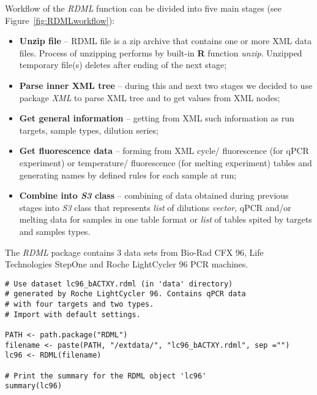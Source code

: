 \documentclass{bioinfo}
\begin{document}
Workflow of the \textit{RDML} function can be divided into five main stages (see Figure~\ref{fig:RDMLworkflow}):
\begin{itemize}
	\item \textbf{Unzip file} -- RDML file is a zip archive that contains one or more XML data files. Process of unzipping performs by built-in \textbf{R} function \textit{unzip}. Unzipped temporary file(s) deletes after ending of the next stage;
	\item \textbf{Parse inner XML tree} -- during this and next two stages we decided to use package \textit{XML} to parse XML tree and to get values from XML nodes;
	\item \textbf{Get general information} -- getting from XML such information as run targets, sample types, dilution series;
	\item \textbf{Get fluorescence data} -- forming from XML cycle/ fluorescence (for qPCR experiment) or temperature/ fluorescence (for melting experiment) tables and generating names by defined rules for each sample at run;
	\item \textbf{Combine into \textit{S3} class} -- combining of data obtained during previous stages into \textit{S3} class that represents \textit{list} of dilutions \textit{vector}, qPCR and/or melting data for samples in one table format or \textit{list} of tables spited by targets and samples types.
\end{itemize}

The \textit{RDML} package contains 3 data sets from Bio-Rad CFX 96, Life Technologies StepOne and Roche LightCycler 96 PCR machines.
\begin{figure*}
	\caption[]{\textit{RDML} workflow representation.}
	\label{fig:RDMLworkflow}
\end{figure*}

\begin{figure*}
\begin{verbatim}
# Use dataset lc96_bACTXY.rdml (in 'data' directory)
# generated by Roche LightCycler 96. Contains qPCR data
# with four targets and two types.
# Import with default settings.

PATH <- path.package("RDML")
filename <- paste(PATH, "/extdata/", "lc96_bACTXY.rdml", sep ="")
lc96 <- RDML(filename)

# Print the summary for the RDML object 'lc96'
summary(lc96)
\end{verbatim}
\end{figure*}
\end{document}
